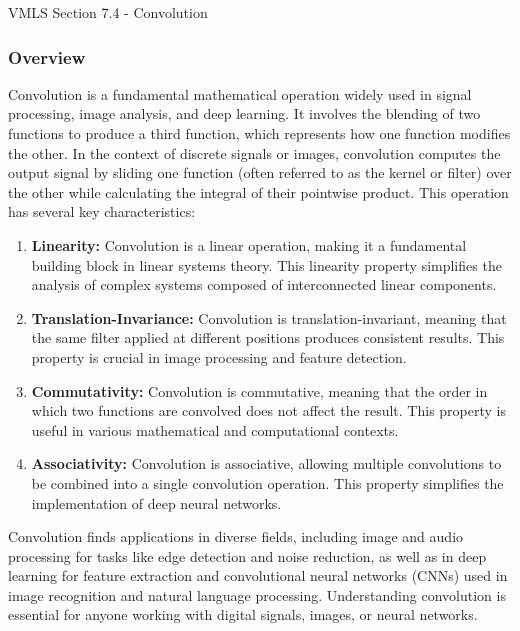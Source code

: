 \begin{notes}{VMLS Section 7.4 - Convolution}
    \subsubsection*{Overview}

    Convolution is a fundamental mathematical operation widely used in signal processing, image analysis, and deep learning. It involves the blending of two functions to produce a third function, 
    which represents how one function modifies the other. In the context of discrete signals or images, convolution computes the output signal by sliding one function (often referred to as the 
    kernel or filter) over the other while calculating the integral of their pointwise product. This operation has several key characteristics:

    \begin{enumerate}
        \item \textbf{Linearity:} Convolution is a linear operation, making it a fundamental building block in linear systems theory. This linearity property simplifies the analysis of complex 
        systems composed of interconnected linear components.

        \item \textbf{Translation-Invariance:} Convolution is translation-invariant, meaning that the same filter applied at different positions produces consistent results. This property is 
        crucial in image processing and feature detection.

        \item \textbf{Commutativity:} Convolution is commutative, meaning that the order in which two functions are convolved does not affect the result. This property is useful in various 
        mathematical and computational contexts.

        \item \textbf{Associativity:} Convolution is associative, allowing multiple convolutions to be combined into a single convolution operation. This property simplifies the implementation 
        of deep neural networks.
    \end{enumerate}

    Convolution finds applications in diverse fields, including image and audio processing for tasks like edge detection and noise reduction, as well as in deep learning for feature extraction 
    and convolutional neural networks (CNNs) used in image recognition and natural language processing. Understanding convolution is essential for anyone working with digital signals, images, 
    or neural networks.
\end{notes}